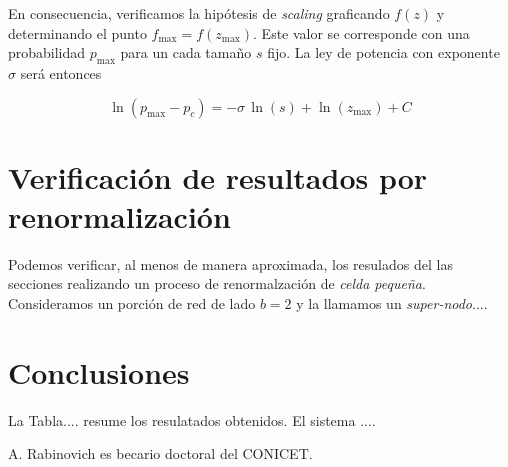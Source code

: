 \documentclass[%
 reprint,
 amsmath,amssymb,
 aps,
spanish]{revtex4-1}
\begin{document}
En consecuencia, verificamos la hip\'otesis de \emph{scaling} graficando $f(z)$  y determinando el punto $f_\mathrm{max}=f(z_\mathrm{max})$. Este valor se corresponde con una probabilidad $p_\mathrm{max}$ para un cada tama\~no $s$ fijo. La ley de potencia con exponente $\sigma$ ser\'a entonces

 
\begin{equation}
\ln(p_\mathrm{max}-p_c)=-\sigma\,\ln(s)+\ln(z_\mathrm{max})+C\label{eqn_3}
\end{equation}


\section{\label{R} Verificaci\'on de resultados por renormalizaci\'on}

Podemos verificar, al menos de manera aproximada, los resulados del las secciones realizando un proceso de renormalzaci\'on de \emph{celda peque\~na}. Consideramos un porci\'on de red de lado $b=2$ y la llamamos un \emph{super-nodo}....

\section{\label{conclusions}Conclusiones}

La Tabla.... resume los resulatados obtenidos. El sistema ....


\begin{acknowledgments}
A. Rabinovich es becario doctoral del CONICET. 
\end{acknowledgments}

\appendix
\end{document}
